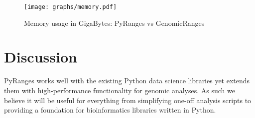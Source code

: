\documentclass[10pt,letterpaper]{article}
\begin{document}
\begin{figure}
\texttt{[image: graphs/memory.pdf]}
\caption{Memory usage in GigaBytes: PyRanges vs GenomicRanges} %
\label{fig2} %
\end{figure} %

\section*{Discussion}

PyRanges works well with the existing Python data science libraries yet extends
them with high-performance functionality for genomic analyses. As such we
believe it will be useful for everything from simplifying one-off analysis
scripts to providing a foundation for bioinformatics libraries written in
Python.





\end{document}
